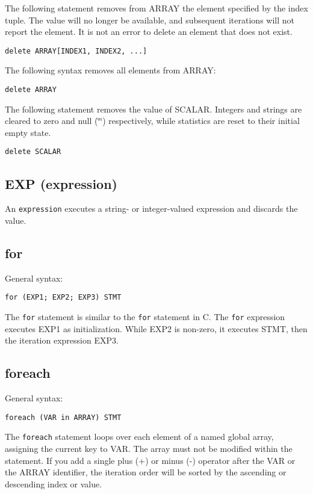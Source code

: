 \documentclass[twoside,english]{article}
\newenvironment{vindent}
{\begin{list}{}{\setlength{\listparindent}{6pt}}
\item[]}
{\end{list}}
\begin{document}
The following statement removes from ARRAY the element specified by the index
tuple. The value will no longer be available, and subsequent iterations will
not report the element. It is not an error to delete an element that does
not exist.

\begin{vindent}
\begin{verbatim}
delete ARRAY[INDEX1, INDEX2, ...]
\end{verbatim}
\end{vindent}
The following syntax removes all elements from ARRAY:

\begin{vindent}
\begin{verbatim}
delete ARRAY
\end{verbatim}
\end{vindent}
The following statement removes the value of SCALAR. Integers and strings
are cleared to zero and null (\char`\"{}\char`\"{}) respectively, while statistics
are reset to their initial empty state.

\begin{vindent}
\begin{verbatim}
delete SCALAR
\end{verbatim}
\end{vindent}

\subsection{EXP (expression)}
An \texttt{expression} executes a string- or integer-valued expression and
discards the value.


\subsection{for}
General syntax:
\begin{vindent}
\begin{verbatim}
for (EXP1; EXP2; EXP3) STMT
\end{verbatim}
\end{vindent}
The \texttt{for} statement is similar to the \texttt{for} statement in C.
The \texttt{for} expression executes EXP1 as initialization. While EXP2 is
non-zero, it executes STMT, then the iteration expression EXP3.

\subsection{foreach\label{sub:foreach}}
General syntax:
\begin{vindent}
\begin{verbatim}
foreach (VAR in ARRAY) STMT
\end{verbatim}
\end{vindent}
The \texttt{foreach} statement loops over each element of a named global array, assigning
the current key to VAR. The array must not be modified within the statement.
If you add a single plus (+) or minus (-) operator after the VAR or the ARRAY
identifier, the iteration order will be sorted by the ascending or descending
index or value.
\end{document}
